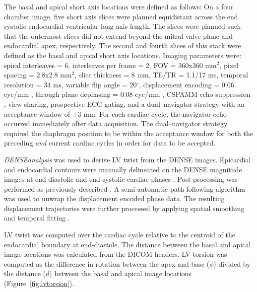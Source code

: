 	The basal and apical short axis locations were defined as follows: On a four chamber image, five short axis slices were planned equidistant across the end systolic endocardial ventricular long axis length. The slices were planned such that the outermost slices did not extend beyond the mitral valve plane and endocardial apex, respectively. The second and fourth slices of this stack were defined as the basal and apical short axis locations. Imaging parameters were: spiral interleaves = 6, interleaves per frame = 2, FOV = 360x360 mm$^2$, pixel spacing = 2.8x2.8 mm$^2$, slice thickness = 8 mm, TE/TR = 1.1/17 ms, temporal resolution = 34 ms, variable flip angle = 20$^{\circ}$, displacement encoding = 0.06 cyc/mm \cite{Wehner2015a}, through plane dephasing = 0.08 cyc/mm \cite{Zhong2006a}, CSPAMM echo suppression \cite{Kim2004}, view sharing, prospective ECG gating, and a dual--navigator strategy \cite{Hamlet2016a} with an acceptance window of $\pm$3 mm. For each cardiac cycle, the navigator echo occurred immediately after data acquisition. The dual--navigator strategy required the diaphragm position to be within the acceptance window for both the preceding \textit{and} current cardiac cycles in order for data to be accepted. 
	
	\textit{DENSEanalysis} \cite{Gilliam2016a} was used to derive LV twist from the DENSE images. Epicardial and endocardial contours were manually delineated on the DENSE magnitude images at end-diastolic and end-systolic cardiac phases \cite{Suever2014}. Post processing was performed as previously described \cite{Suever2014}. A semi-automatic path following algorithm was used to unwrap the displacement encoded phase data. The resulting displacement trajectories were further processed by applying spatial smoothing and temporal fitting \cite{Spottiswoode2007}.
	
	LV twist was computed over the cardiac cycle relative to the centroid of the endocardial boundary at end-diastole. The distance between the basal and apical image locations was calculated from the DICOM headers. LV torsion was computed as the difference in rotation between the apex and base ($\phi$) divided by the distance ($d$) between the basal and apical image locations \cite{Donekal2013a,Phan2009a,Sorger2003a} (Figure~\ref{fig:lvtorsion}).

